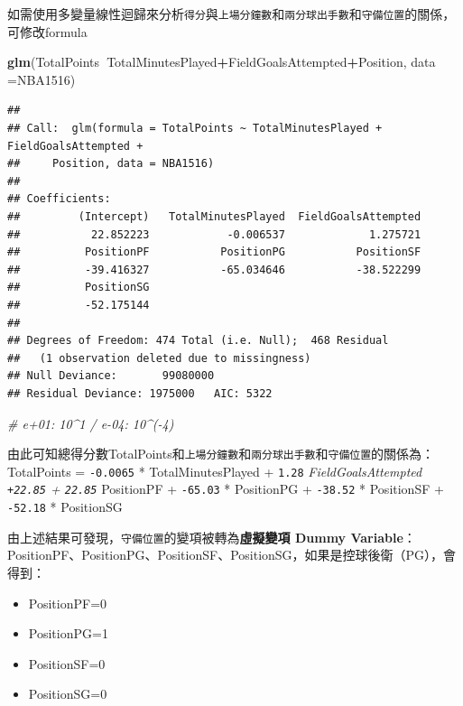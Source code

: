\documentclass[]{book}
\newenvironment{Shaded}{\begin{snugshade}}{\end{snugshade}}
\newcommand{\CommentTok}[1]{\textcolor[rgb]{0.56,0.35,0.01}{\textit{#1}}}
\newcommand{\DataTypeTok}[1]{\textcolor[rgb]{0.13,0.29,0.53}{#1}}
\newcommand{\KeywordTok}[1]{\textcolor[rgb]{0.13,0.29,0.53}{\textbf{#1}}}
\newcommand{\NormalTok}[1]{#1}
\newcommand{\OperatorTok}[1]{\textcolor[rgb]{0.81,0.36,0.00}{\textbf{#1}}}
\providecommand{\tightlist}{%
  \setlength{\itemsep}{0pt}\setlength{\parskip}{0pt}}
\begin{document}
如需使用多變量線性迴歸來分析\texttt{得分}與\texttt{上場分鐘數}和\texttt{兩分球出手數}和\texttt{守備位置}的關係，可修改formula

\begin{Shaded}
\begin{Highlighting}[]
\KeywordTok{glm}\NormalTok{(TotalPoints}\OperatorTok{~}\NormalTok{TotalMinutesPlayed}\OperatorTok{+}\NormalTok{FieldGoalsAttempted}\OperatorTok{+}\NormalTok{Position,}
    \DataTypeTok{data =}\NormalTok{NBA1516)}
\end{Highlighting}
\end{Shaded}

\begin{verbatim}
## 
## Call:  glm(formula = TotalPoints ~ TotalMinutesPlayed + FieldGoalsAttempted + 
##     Position, data = NBA1516)
## 
## Coefficients:
##         (Intercept)   TotalMinutesPlayed  FieldGoalsAttempted  
##           22.852223            -0.006537             1.275721  
##          PositionPF           PositionPG           PositionSF  
##          -39.416327           -65.034646           -38.522299  
##          PositionSG  
##          -52.175144  
## 
## Degrees of Freedom: 474 Total (i.e. Null);  468 Residual
##   (1 observation deleted due to missingness)
## Null Deviance:       99080000 
## Residual Deviance: 1975000   AIC: 5322
\end{verbatim}

\begin{Shaded}
\begin{Highlighting}[]
\CommentTok{# e+01: 10^1 / e-04: 10^(-4)}
\end{Highlighting}
\end{Shaded}

由此可知總得分數TotalPoints和\texttt{上場分鐘數}和\texttt{兩分球出手數}和\texttt{守備位置}的關係為：
TotalPoints = \texttt{-0.0065} * TotalMinutesPlayed + \texttt{1.28} \emph{FieldGoalsAttempted \texttt{+22.85} + \texttt{22.85} } PositionPF + \texttt{-65.03} * PositionPG + \texttt{-38.52} * PositionSF + \texttt{-52.18} * PositionSG

由上述結果可發現，\texttt{守備位置}的變項被轉為\textbf{虛擬變項 Dummy Variable}：PositionPF、PositionPG、PositionSF、PositionSG，如果是控球後衛（PG），會得到：

\begin{itemize}
\tightlist
\item
  PositionPF=0
\item
  PositionPG=1
\item
  PositionSF=0
\item
  PositionSG=0
\end{itemize}
\end{document}
